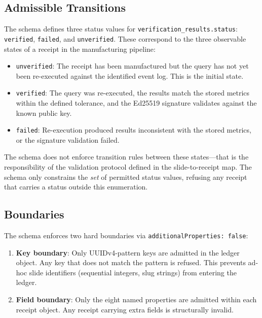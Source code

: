 \subsection{Admissible Transitions}
\label{sec:schemas-architecture-transitions}

The schema defines three status values for \texttt{verification\_results.status}:
\texttt{verified}, \texttt{failed}, and \texttt{unverified}. These correspond to the three
observable states of a receipt in the manufacturing pipeline:

\begin{itemize}
  \item \texttt{unverified}: The receipt has been manufactured but the query has not yet been
    re-executed against the identified event log. This is the initial state.
  \item \texttt{verified}: The query was re-executed, the results match the stored metrics within
    the defined tolerance, and the Ed25519 signature validates against the known public key.
  \item \texttt{failed}: Re-execution produced results inconsistent with the stored metrics, or
    the signature validation failed.
\end{itemize}

The schema does not enforce transition rules between these states---that is the responsibility of
the validation protocol defined in the slide-to-receipt map. The schema only constrains the
\emph{set} of permitted status values, refusing any receipt that carries a status outside this
enumeration.

\subsection{Boundaries}
\label{sec:schemas-architecture-boundaries}

The schema enforces two hard boundaries via \texttt{additionalProperties: false}:

\begin{enumerate}
  \item \textbf{Key boundary}: Only UUIDv4-pattern keys are admitted in the ledger object. Any
    key that does not match the pattern is refused. This prevents ad-hoc slide identifiers
    (sequential integers, slug strings) from entering the ledger.
  \item \textbf{Field boundary}: Only the eight named properties are admitted within each
    receipt object. Any receipt carrying extra fields is structurally invalid.
\end{enumerate}

